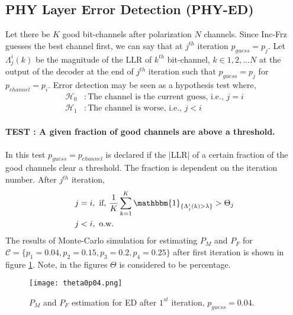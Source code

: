 \documentclass[
11pt, %
a4paper, %
oneside, %
headinclude,footinclude, %
BCOR5mm, %
]{scrartcl}
\begin{document}
\subsection*{PHY Layer Error Detection (PHY-ED)} 
Let there be $K$ good bit-channels after polarization $N$ channels.  
Since Inc-Frz guesses the best channel first, we can say that at $j^{th}$ iteration $p_{guess}=p_j$. 
Let $\Lambda_j^i(k)$ be the magnitude of the LLR of $k^{th}$ bit-channel, $k\in{1,2,...N}$ at the output of the decoder at the end of $j^{th}$ iteration such that $p_{guess}=p_j$ for $p_{channel}=p_i$. 
Error detection may be seen as a hypothesis test where,
\begin{align*}
\mathcal{H}_0 & :\text{The channel is the current guess, i.e., } j=i\\
\mathcal{H}_1 & :\text{The channel is worse, i.e., }j<i
\end{align*}
\paragraph{TEST : A given fraction of good channels are above a threshold.}  
In this test $p_{guess}=p_{channel}$ is declared if the |LLR| of a certain fraction of the good channels clear a threshold. The fraction is dependent on the iteration number. After $j^{th}$ iteration,
\begin{align*}  
j &=i,
 \text{   if, } \frac{1}{K}\sum^K_{k=1} \mathbbm{1}_{\{\Lambda_{j}^i(k) > \lambda\}} > \Theta_j \\
j & < i,  \text{ o.w. }
\end{align*} 
The results of Monte-Carlo simulation for estimating $P_M$ and $P_F$ for $\mathcal{C}=\{p_1=0.04,p_2=0.15,p_3=0.2,p_4=0.25\}$ after first iteration is shown in figure \ref{fig:theta1}. Note, in the figures $\Theta$ is considered to be percentage.
\begin{figure}[h!]
 \begin{center}
    \texttt{[image: theta0p04.png]}
  \end{center}
  \caption{$P_M$ and $P_F$ estimation for ED after $1^{st}$ iteration, $p_{guess}=0.04$.}
  \label{fig:theta1}
\end{figure}
\end{document}
